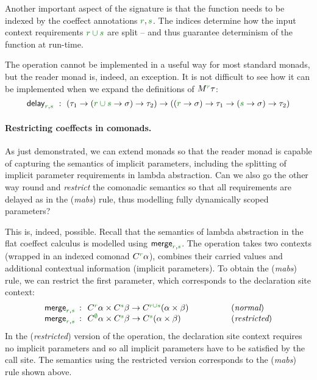 Another important aspect of the signature is that the function needs to be indexed by the coeffect
annotations $\cclrd{r}, \cclrd{s}$. The indices determine how the input context requirements
$\cclrd{r \cup s}$ are split -- and thus guarantee determinism of the function at run-time.

The operation cannot be implemented in a useful way for most standard monads, but the 
reader monad is, indeed, an exception. It is not difficult to see how it can be implemented
when we expand the definitions of $\mtyp{\cclrd{r}}\tau$:
%
\begin{equation*}
\ident{delay}_{\cclrd{r}, \cclrd{s}}~:~
(\tau_1\rightarrow(\cclrd{r \cup s} \rightarrow \sigma) \rightarrow \tau_2) \rightarrow 
((\cclrd{r} \rightarrow \sigma) \rightarrow \tau_1\rightarrow(\cclrd{s} \rightarrow \sigma) \rightarrow \tau_2)
\end{equation*}

\paragraph{Restricting coeffects in comonads.} 
As just demonstrated, we can extend monads so that the reader monad is capable of capturing
the semantics of implicit parameters, including the splitting of implicit parameter requirements
in lambda abstraction. Can we also go the other way round and \emph{restrict} the comonadic
semantics so that all requirements are delayed as in the (\emph{mabs}) rule, thus modelling 
fully dynamically scoped parameters?

This is, indeed, possible. Recall that the semantics of lambda abstraction in the flat
coeffect calculus is modelled using $\ident{merge}_{\cclrd{r}, \cclrd{s}}$. The operation takes
two contexts (wrapped in an indexed comonad $\ctyp{\cclrd{r}}\alpha$), combines their carried 
values and additional contextual information (implicit parameters). To obtain the (\emph{mabs}) 
rule, we can restrict the first parameter, which corresponds to the declaration site context:
%
\begin{equation*}
\begin{array}{rcll}
 \ident{merge}_{\cclrd{r}, \cclrd{s}} &\narrow{:}& \ctyp{\cclrd{r}}\alpha \times \ctyp{\cclrd{s}}\beta \rightarrow \ctyp{\cclrd{r \cup s}}(\alpha \times \beta)
 &\hspace{4em}(\textit{normal}) \\
 \ident{merge}_{\cclrd{r}, \cclrd{s}} &\narrow{:}& \ctyp{\cclrd{\emptyset}}\alpha \times \ctyp{\cclrd{s}}\beta \rightarrow \ctyp{\cclrd{s}}(\alpha \times \beta)
 &\hspace{4em}(\textit{restricted})
\end{array} 
\end{equation*}
%
In the (\emph{restricted}) version of the operation, the declaration site context requires
no implicit parameters and so all implicit parameters have to be satisfied by the call site.
The semantics using the restricted version corresponds to the (\emph{mabs}) rule shown above.

